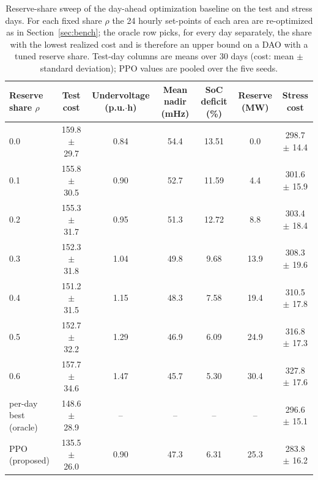 \begin{table}[!t]
\caption{Reserve-share sweep of the day-ahead optimization baseline on the test and stress days. For each fixed share $\rho$ the 24 hourly set-points of each area are re-optimized as in Section~\ref{sec:bench}; the oracle row picks, for every day separately, the share with the lowest realized cost and is therefore an upper bound on a DAO with a tuned reserve share. Test-day columns are means over 30 days (cost: mean $\pm$ standard deviation); PPO values are pooled over the five seeds.}
\label{tab:daorho}
\centering
\footnotesize
\begin{tabular}{lcccccc}
\toprule
\textbf{Reserve share $\rho$} & \textbf{Test cost} & \textbf{Undervoltage (p.u.$\cdot$h)} & \textbf{Mean nadir (mHz)} & \textbf{SoC deficit (\%)} & \textbf{Reserve (MW)} & \textbf{Stress cost}\\
\midrule
0.0 & 159.8 $\pm$ 29.7 & 0.84 & 54.4 & 13.51 & 0.0 & 298.7 $\pm$ 14.4 \\
0.1 & 155.8 $\pm$ 30.5 & 0.90 & 52.7 & 11.59 & 4.4 & 301.6 $\pm$ 15.9 \\
0.2 & 155.3 $\pm$ 31.7 & 0.95 & 51.3 & 12.72 & 8.8 & 303.4 $\pm$ 18.4 \\
0.3 & 152.3 $\pm$ 31.8 & 1.04 & 49.8 & 9.68 & 13.9 & 308.3 $\pm$ 19.6 \\
0.4 & 151.2 $\pm$ 31.5 & 1.15 & 48.3 & 7.58 & 19.4 & 310.5 $\pm$ 17.8 \\
0.5 & 152.7 $\pm$ 32.2 & 1.29 & 46.9 & 6.09 & 24.9 & 316.8 $\pm$ 17.3 \\
0.6 & 157.7 $\pm$ 34.6 & 1.47 & 45.7 & 5.30 & 30.4 & 327.8 $\pm$ 17.6 \\
per-day best (oracle) & 148.6 $\pm$ 28.9 & -- & -- & -- & -- & 296.6 $\pm$ 15.1 \\
PPO (proposed) & 135.5 $\pm$ 26.0 & 0.90 & 47.3 & 6.31 & 25.3 & 283.8 $\pm$ 16.2 \\
\bottomrule
\end{tabular}
\end{table}
